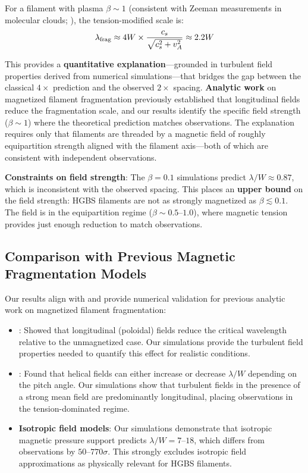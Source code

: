 \documentclass[11pt,a4paper]{article}
\begin{document}
For a filament with plasma $\beta \sim 1$ (consistent with Zeeman measurements in molecular clouds; \citealt{Crutcher2012}), the tension-modified scale is:
\begin{equation}
\lambda_{\rm frag} \approx 4W \times \frac{c_s}{\sqrt{c_s^2 + v_A^2}} \approx 2.2W
\end{equation}

This provides a \textbf{quantitative explanation}—grounded in turbulent field properties derived from numerical simulations—that bridges the gap between the classical $4\times$ prediction and the observed $2\times$ spacing. \textbf{Analytic work} on magnetized filament fragmentation \citep{Fiege2000, Hanawa2017} previously established that longitudinal fields reduce the fragmentation scale, and our results identify the specific field strength ($\beta \sim 1$) where the theoretical prediction matches observations. The explanation requires only that filaments are threaded by a magnetic field of roughly equipartition strength aligned with the filament axis—both of which are consistent with independent observations.

\textbf{Constraints on field strength}: The $\beta = 0.1$ simulations predict $\lambda/W \approx 0.87$, which is inconsistent with the observed spacing. This places an \textbf{upper bound} on the field strength: HGBS filaments are not as strongly magnetized as $\beta \lesssim 0.1$. The field is in the equipartition regime ($\beta \sim 0.5$--$1.0$), where magnetic tension provides just enough reduction to match observations.

\subsection{Comparison with Previous Magnetic Fragmentation Models}

Our results align with and provide numerical validation for previous analytic work on magnetized filament fragmentation:

\begin{itemize}
    \item \citet{Fiege2000}: Showed that longitudinal (poloidal) fields reduce the critical wavelength relative to the unmagnetized case. Our simulations provide the turbulent field properties needed to quantify this effect for realistic conditions.
    \item \citet{Hanawa2017}: Found that helical fields can either increase or decrease $\lambda/W$ depending on the pitch angle. Our simulations show that turbulent fields in the presence of a strong mean field are predominantly longitudinal, placing observations in the tension-dominated regime.
    \item \textbf{Isotropic field models}: Our simulations demonstrate that isotropic magnetic pressure support predicts $\lambda/W = 7$--$18$, which differs from observations by $50$--$770\sigma$. This strongly excludes isotropic field approximations as physically relevant for HGBS filaments.
\end{itemize}
\end{document}
